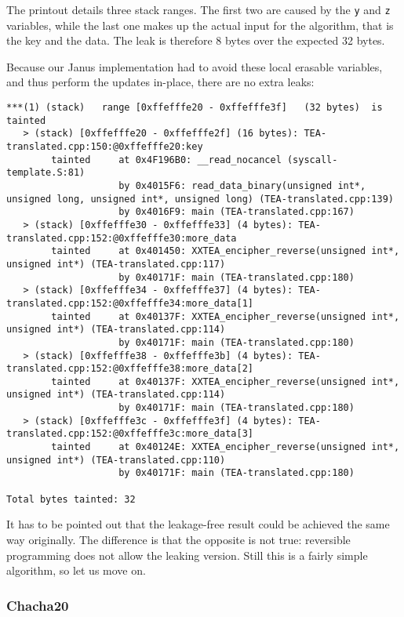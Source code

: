 \documentclass[a4paper,10pt,openright]{memoir}
\newcommand{\code}[1]{\texttt{#1}}
\begin{document}
The printout details three stack ranges. The first two are caused by 
the \code{y} and \code{z} variables, while the last one makes up the 
actual input for the algorithm, that is the key and the data. The leak 
is therefore 8 bytes over the expected 32 bytes.

Because our Janus implementation had to avoid these local erasable 
variables, and thus perform the updates in-place, there are no extra 
leaks:

\begin{verbatim}
***(1) (stack)	 range [0xffefffe20 - 0xffefffe3f]	 (32 bytes)	 is tainted
   > (stack) [0xffefffe20 - 0xffefffe2f] (16 bytes): TEA-translated.cpp:150:@0xffefffe20:key
        tainted     at 0x4F196B0: __read_nocancel (syscall-template.S:81)
                    by 0x4015F6: read_data_binary(unsigned int*, unsigned long, unsigned int*, unsigned long) (TEA-translated.cpp:139)
                    by 0x4016F9: main (TEA-translated.cpp:167)
   > (stack) [0xffefffe30 - 0xffefffe33] (4 bytes): TEA-translated.cpp:152:@0xffefffe30:more_data
        tainted     at 0x401450: XXTEA_encipher_reverse(unsigned int*, unsigned int*) (TEA-translated.cpp:117)
                    by 0x40171F: main (TEA-translated.cpp:180)
   > (stack) [0xffefffe34 - 0xffefffe37] (4 bytes): TEA-translated.cpp:152:@0xffefffe34:more_data[1]
        tainted     at 0x40137F: XXTEA_encipher_reverse(unsigned int*, unsigned int*) (TEA-translated.cpp:114)
                    by 0x40171F: main (TEA-translated.cpp:180)
   > (stack) [0xffefffe38 - 0xffefffe3b] (4 bytes): TEA-translated.cpp:152:@0xffefffe38:more_data[2]
        tainted     at 0x40137F: XXTEA_encipher_reverse(unsigned int*, unsigned int*) (TEA-translated.cpp:114)
                    by 0x40171F: main (TEA-translated.cpp:180)
   > (stack) [0xffefffe3c - 0xffefffe3f] (4 bytes): TEA-translated.cpp:152:@0xffefffe3c:more_data[3]
        tainted     at 0x40124E: XXTEA_encipher_reverse(unsigned int*, unsigned int*) (TEA-translated.cpp:110)
                    by 0x40171F: main (TEA-translated.cpp:180)

Total bytes tainted: 32
\end{verbatim}

It has to be pointed out that the leakage-free result could be achieved 
the same way originally. The difference is that the opposite is not 
true: reversible programming does not allow the leaking version. Still 
this is a fairly simple algorithm, so let us move on.

\subsubsection{Chacha20}
\end{document}
